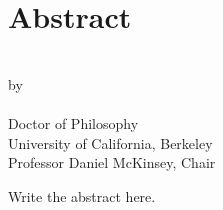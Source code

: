


\begingroup
\let\clearpage\relax
\let\cleardoublepage\relax
\let\cleardoublepage\relax

\chapter*{Abstract}

\begin{center}
\myTitle \\ \bigskip
by \\ \bigskip
\myName \\ \bigskip
Doctor of Philosophy \\ \smallskip
University of California, Berkeley \\ \smallskip
Professor Daniel McKinsey, Chair \\
\end{center}

\vspace{2cm}

\noindent Write the abstract here.
\endgroup			

\vfill
